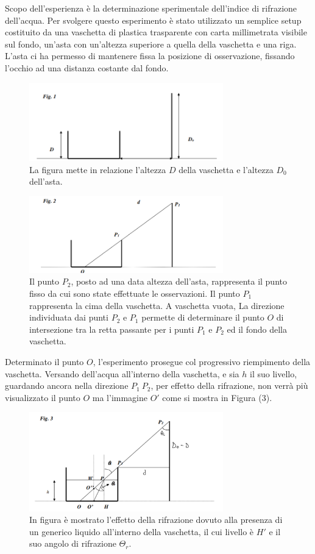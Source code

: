 Scopo dell'esperienza è la determinazione sperimentale dell'indice di rifrazione dell'acqua. Per svolgere questo esperimento è stato utilizzato un semplice setup costituito da una vaschetta di plastica trasparente con carta millimetrata visibile sul fondo, un'asta con un'altezza superiore a quella della vaschetta e una riga. L'asta ci ha permesso di mantenere fissa la posizione di osservazione, fissando l'occhio ad una distanza costante dal fondo.

\begin{figure}[H]
	\centering
	\includegraphics[width=0.75\textwidth]{./figures/Im1}
	\caption{La figura mette in relazione l'altezza $D$ della vaschetta e l'altezza $D_0$ dell'asta.}
\end{figure}

\begin{figure}[H]
	\centering
	\includegraphics[width=0.75\textwidth]{./figures/Im2}
	\caption{Il punto $P_2$, posto ad una data altezza dell'asta, rappresenta il punto fisso da cui sono state effettuate le osservazioni. Il punto $P_1$ rappresenta la cima della vaschetta. A vaschetta vuota, La direzione individuata dai punti $P_2$ e $P_1$ permette di determinare il punto $O$ di intersezione tra la retta passante per i punti $P_1$ e $P_2$ ed il fondo della vaschetta.}
\end{figure}

Determinato il punto $O$, l'esperimento prosegue col progressivo riempimento della vaschetta. Versando dell'acqua all'interno della vaschetta, e sia $h$ il suo livello, guardando ancora nella direzione $P_1\ P_2$, per effetto della rifrazione, non verrà più visualizzato il punto $O$ ma l'immagine $O'$ come si mostra in Figura (3).

\begin{figure}[H]
	\centering
	\includegraphics[width=0.75\textwidth]{./figures/Im3}
	\caption{In figura è mostrato l'effetto della rifrazione dovuto alla presenza di un generico liquido all'interno della vaschetta, il cui livello è $H'$ e il suo angolo di rifrazione $\Theta_r$.}
\end{figure}